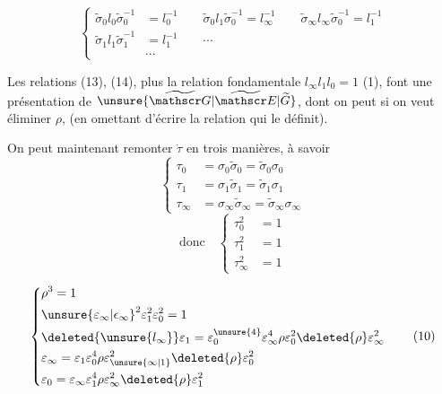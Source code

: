 \[
\left\{\begin{aligned}
\widetilde\sigma_0l_0\widetilde\sigma_0^{-1}&=l_0^{-1}\qquad
\widetilde\sigma_0l_1\widetilde\sigma_0^{-1}=l_\infty^{-1}\qquad
\widetilde\sigma_\infty l_\infty\widetilde\sigma_0^{-1}=l_1^{-1}\\
\widetilde\sigma_1l_1\widetilde\sigma_1^{-1}&=l_1^{-1}\qquad\cdots\\
&\cdots
\end{aligned}\right.\tag*{(14)}
\]

Les relations (13), (14), plus la relation fondamentale $l_\infty l_1l_0=1$ (1), font une présentation de $\unsure{\widetilde{\mathscr G}|\widetilde{\mathscr E}|\widetilde G}$, dont on peut si on veut éliminer $\rho$, (en omettant d'écrire la relation qui le définit).

On peut maintenant remonter $\dot\tau$ en trois manières, à savoir
\[
\left\{\begin{aligned}
\tau_0&=\sigma_0\widetilde\sigma_0=\widetilde\sigma_0\sigma_0\\
\tau_1&=\sigma_1\widetilde\sigma_1=\widetilde\sigma_1\sigma_1\\
\tau_\infty&=\sigma_\infty\widetilde\sigma_\infty=\widetilde\sigma_\infty\sigma_\infty
\end{aligned}\right.\tag*{(15)}
\]
\[
\text{donc}\quad
\left\{\begin{aligned}
\tau_0^2&=1\\
\tau_1^2&=1\\
\tau_\infty^2&=1
\end{aligned}\right.\tag*{(16)}
\]

\[
\left\{\begin{aligned}
&\rho^3=1\\
&\unsure{\varepsilon_\infty|\epsilon_\infty}^{2}\varepsilon_1^2\varepsilon_0^2=1\\
&\deleted{\unsure{l_\infty}}\varepsilon_1=\varepsilon_0^{\unsure{4}}\varepsilon_\infty^4\rho\varepsilon_0^2\deleted{\rho}\varepsilon_\infty^2\\
&\varepsilon_\infty=\varepsilon_1\varepsilon_0^4\rho\varepsilon_{\unsure{\infty|1}}^2\deleted{\rho}\varepsilon_0^2\\
&\varepsilon_0=\varepsilon_\infty\varepsilon_1^4\rho\varepsilon_\infty^2\deleted{\rho}\varepsilon_1^2
\end{aligned}\right.\tag*{(10)}
\]

